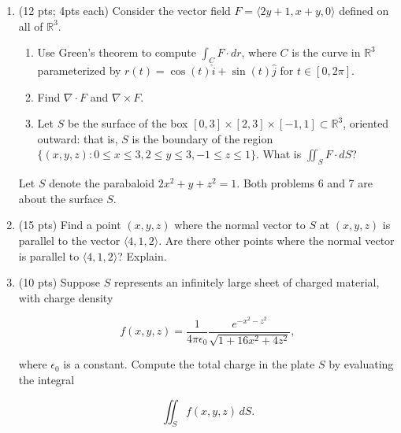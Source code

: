 \documentclass[12 pt]{report}
\begin{document}
\begin{enumerate}
\newpage

\item (12 pts; 4pts each) Consider the vector field $F = \langle 2y + 1, x+y, 0 \rangle$ defined on all of $\mathbb{R}^3$. 

\begin{enumerate} \item Use Green's theorem to compute $\int_C F \cdot dr$, where $C$ is the curve in $\mathbb{R}^3$ parameterized by $r(t) = \cos(t) \hat{i} + \sin(t)\hat{j}$ for $t \in [0,2\pi]$. 

\vfill 

\item Find $\nabla \cdot F$ and $\nabla \times F$. 

\vfill

\item Let $S$ be the surface of the box $[0,3] \times [2,3] \times [-1,1] \subset \mathbb{R}^3$, oriented outward: that is, $S$ is the boundary of the region $\{(x,y,z): 0 \leq x \leq 3, 2 \leq y \leq 3, -1 \leq z \leq 1\}.$ What is $\iint_S F \cdot dS$?

\vfill

\end{enumerate}

\newpage

Let $S$ denote the parabaloid $2x^2 + y + z^2 = 1$. Both problems 6 and 7 are about the surface $S$.

\item (15 pts) Find a point $(x,y,z)$ where the normal vector to $S$ at $(x,y,z)$ is parallel to the vector $\langle 4,1,2 \rangle$. Are there other points where the normal vector is parallel to $\langle 4,1,2 \rangle$? Explain. 

\vfill

\newpage

\item (10 pts) Suppose $S$ represents an infinitely large sheet of charged material, with charge density 

\[
f(x,y,z) = \frac{1}{4\pi \epsilon_0} \frac{e^{-x^2-z^2}}{\sqrt{1+16x^2+4z^2}},
\]

where $\epsilon_0$ is a constant. Compute the total charge in the plate $S$ by evaluating the integral

\[
\iint_S f(x,y,z) \, dS.
\]

\vfill


\end{enumerate}
\end{document}
